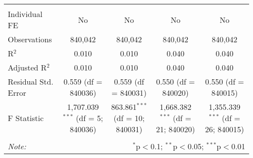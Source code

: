 \documentclass[
]{article}
\begin{document}
\begin{table}[!htbp]
{\begin{tabular}{@{\extracolsep{5pt}}lcccc}
\hline \\[-1.8ex] 
Individual FE & No & No & No & No \\ 
Observations & 840,042 & 840,042 & 840,042 & 840,042 \\ 
R$^{2}$ & 0.010 & 0.010 & 0.040 & 0.040 \\ 
Adjusted R$^{2}$ & 0.010 & 0.010 & 0.040 & 0.040 \\ 
Residual Std. Error & 0.559 (df = 840036) & 0.559 (df = 840031) & 0.550 (df = 840020) & 0.550 (df = 840015) \\ 
F Statistic & 1,707.039$^{***}$ (df = 5; 840036) & 863.861$^{***}$ (df = 10; 840031) & 1,668.382$^{***}$ (df = 21; 840020) & 1,355.339$^{***}$ (df = 26; 840015) \\ 
\hline 
\hline \\[-1.8ex] 
\textit{Note:}  & \multicolumn{4}{r}{$^{*}$p$<$0.1; $^{**}$p$<$0.05; $^{***}$p$<$0.01} \\ 
\end{tabular}
} 
\end{table} 
\newpage
\end{document}
